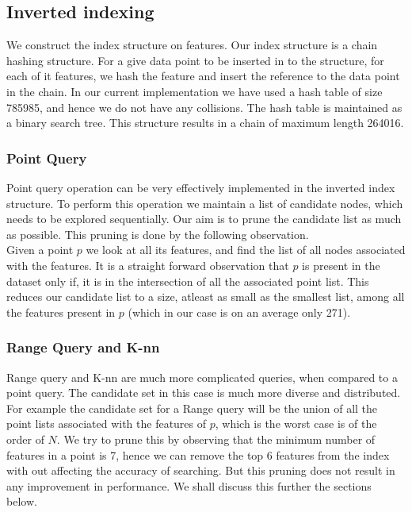 \subsection{Inverted indexing}

We construct the index structure on features. Our index structure is a chain hashing structure. For a give data point to be inserted in to the structure, for each of it features, we hash the feature and insert the reference to the data point in the chain. In our current implementation we have used a hash table of size 785985, and hence we do not have any collisions. The hash table is maintained as a binary search tree. This structure results in a chain of maximum length 264016.\\

\subsubsection{Point Query}

Point query operation can be very effectively 
implemented in the inverted index structure. To perform this operation we maintain a list of candidate nodes, which needs to be explored sequentially. Our aim is to prune the candidate list as much as possible. This pruning is done by the following observation.\\
Given a point $p$ we look at all its features, and find the list of all nodes associated with the features. It is a straight forward observation that $p$ is present in the dataset only if, it is in the intersection of all the associated point list. This reduces our candidate list to a size, atleast as small as the smallest list, among all the features present in $p$ (which in our case is on an average only 271).\\

\subsubsection{Range Query and K-nn}
Range query and K-nn are much more complicated queries, when compared to a point query. The candidate set in this case is much more diverse and distributed. For example the candidate set for a Range query will be the union of all the point lists associated with the features of $p$, which is the worst case is of the order of $N$. We try to prune this by observing that the minimum number of features in a point is 7, hence we can remove the top 6 features from the index with out affecting the accuracy of searching. But this pruning does not result in any improvement in performance. We shall discuss this further the sections below.\\

